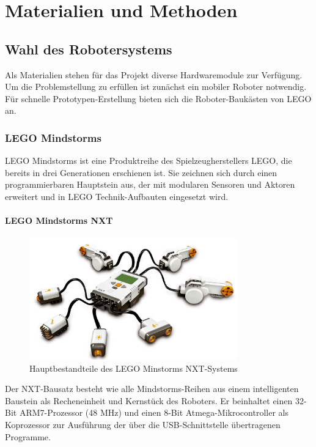 \chapter{Materialien und Methoden}
\label{cha:Materials}

\section{Wahl des Robotersystems}

Als Materialien stehen für das Projekt diverse Hardwaremodule zur Verfügung. Um die Problemstellung zu erfüllen ist zunächst ein mobiler Roboter notwendig. Für schnelle Prototypen-Erstellung bieten sich die Roboter-Baukästen von LEGO an.

\subsection{LEGO Mindstorms}

LEGO Mindstorms ist eine Produktreihe des Spielzeugherstellers LEGO, die bereits in drei Generationen erschienen ist. Sie zeichnen sich durch einen programmierbaren Hauptstein aus, der mit modularen Sensoren und Aktoren erweitert und in LEGO Technik-Aufbauten eingesetzt wird.

\subsubsection{LEGO Mindstorms NXT}

\begin{figure}[h]
\centering
\includegraphics[width=0.8\textwidth]{Bilder/MatsAndMets/nxt}
\caption{Hauptbestandteile des LEGO Minstorms NXT-Systems}
\label{fig:nxt}
\end{figure}

Der NXT-Bausatz besteht wie alle Mindstorms-Reihen aus einem intelligenten Baustein als Recheneinheit und Kernstück des Roboters. Er beinhaltet einen 32-Bit ARM7-Prozessor (48 MHz) und einen 8-Bit Atmega-Mikrocontroller als Koprozessor zur Ausführung der über die USB-Schnittstelle übertragenen Programme.

